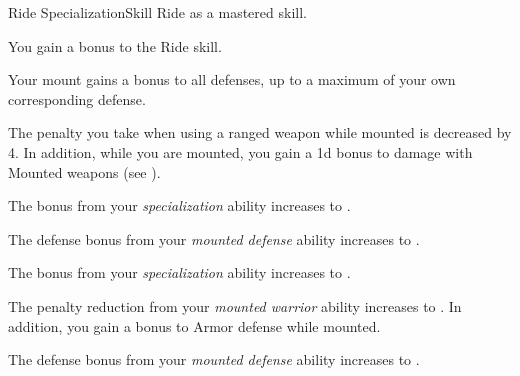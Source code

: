     \begin{feat}{Ride Specialization}{Skill}
        \featpre Ride as a mastered skill.

         You gain a  bonus to the Ride skill.

         Your mount gains a  bonus to all defenses, up to a maximum of your own corresponding defense.

         The penalty you take when using a ranged weapon while mounted is decreased by 4.
        In addition, while you are mounted, you gain a \plus1d bonus to damage with Mounted weapons (see ).

         The bonus from your \textit{specialization} ability increases to .

         The defense bonus from your \textit{mounted defense} ability increases to .

         The bonus from your \textit{specialization} ability increases to .

         The penalty reduction from your \textit{mounted warrior} ability increases to .
        In addition, you gain a  bonus to Armor defense while mounted.

         The defense bonus from your \textit{mounted defense} ability increases to .
    \end{feat}

